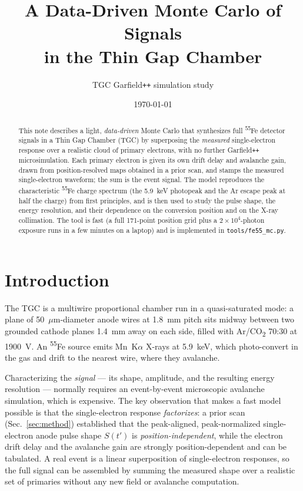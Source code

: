\documentclass[11pt,a4paper]{article}
\title{A Data-Driven Monte Carlo of \Fe{} Signals\\ in the Thin Gap Chamber}
\author{TGC Garfield\texttt{++} simulation study}
\date{\today}
\newcommand{\Fe}{\textsuperscript{55}Fe}
\newcommand{\co}{CO\textsubscript{2}}
\begin{document}
\maketitle

\begin{abstract}
\noindent
This note describes a light, \emph{data-driven} Monte Carlo that synthesizes full \Fe{} detector
signals in a Thin Gap Chamber (TGC) by superposing the \emph{measured} single-electron response over a
realistic cloud of primary electrons, with no further Garfield\texttt{++} microsimulation. Each primary
electron is given its own drift delay and avalanche gain, drawn from position-resolved maps obtained in
a prior scan, and stamps the measured single-electron waveform; the sum is the event signal. The model
reproduces the characteristic \Fe{} charge spectrum (the 5.9~keV photopeak and the Ar escape peak at
half the charge) from first principles, and is then used to study the pulse shape, the energy
resolution, and their dependence on the conversion position and on the X-ray collimation. The tool is
fast (a full 171-point position grid plus a $2\times10^{4}$-photon exposure runs in a few minutes on a
laptop) and is implemented in \texttt{tools/fe55\_mc.py}.
\end{abstract}

\tableofcontents

\section{Introduction}
The TGC is a multiwire proportional chamber run in a quasi-saturated mode: a plane of
50~$\mu$m-diameter anode wires at 1.8~mm pitch sits midway between two
grounded cathode planes 1.4~mm away on each side, filled with Ar/\co{} 70:30 at
1900~V. An \Fe{} source emits Mn~K$\alpha$ X-rays at 5.9~keV, which photo-convert in the
gas and drift to the nearest wire, where they avalanche.

Characterizing the \emph{signal} — its shape, amplitude, and the resulting energy resolution — normally
requires an event-by-event microscopic avalanche simulation, which is expensive. The key observation
that makes a fast model possible is that the single-electron response \emph{factorizes}: a prior scan
(Sec.~\ref{sec:method}) established that the peak-aligned, peak-normalized single-electron anode pulse
shape $S(t')$ is \emph{position-independent}, while the electron drift delay and the avalanche gain are
strongly position-dependent and can be tabulated. A real event is a linear superposition of
single-electron responses, so the full signal can be assembled by summing the measured shape over a
realistic set of primaries without any new field or avalanche computation.
\end{document}

